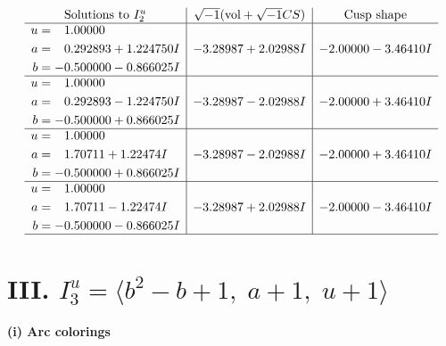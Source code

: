 \documentclass[1p]{elsarticle_modified}
\theoremstyle{definition}
\newcommand{\I}{\sqrt{-1}}
\begin{document}
$$\begin{array}{c|c|c}  
\text{Solutions to }I^u_{2}& \I (\text{vol} + \sqrt{-1}CS) & \text{Cusp shape}\\
 \hline 
\begin{aligned}
u &= \phantom{-}1.00000\phantom{ +0.000000I} \\
a &= \phantom{-}0.292893 + 1.224750 I \\
b &= -0.500000 - 0.866025 I\end{aligned}
 & -3.28987 + 2.02988 I & -2.00000 - 3.46410 I \\ \hline\begin{aligned}
u &= \phantom{-}1.00000\phantom{ +0.000000I} \\
a &= \phantom{-}0.292893 - 1.224750 I \\
b &= -0.500000 + 0.866025 I\end{aligned}
 & -3.28987 - 2.02988 I & -2.00000 + 3.46410 I \\ \hline\begin{aligned}
u &= \phantom{-}1.00000\phantom{ +0.000000I} \\
a &= \phantom{-}1.70711 + 1.22474 I \\
b &= -0.500000 + 0.866025 I\end{aligned}
 & -3.28987 - 2.02988 I & -2.00000 + 3.46410 I \\ \hline\begin{aligned}
u &= \phantom{-}1.00000\phantom{ +0.000000I} \\
a &= \phantom{-}1.70711 - 1.22474 I \\
b &= -0.500000 - 0.866025 I\end{aligned}
 & -3.28987 + 2.02988 I & -2.00000 - 3.46410 I\\
 \hline 
 \end{array}$$\newpage\newpage\renewcommand{\arraystretch}{1}
\centering \section*{III. $I^u_{3}= \langle b^2- b+1,\;a+1,\;u+1 \rangle$}
\flushleft \textbf{(i) Arc colorings}\\
\end{document}
